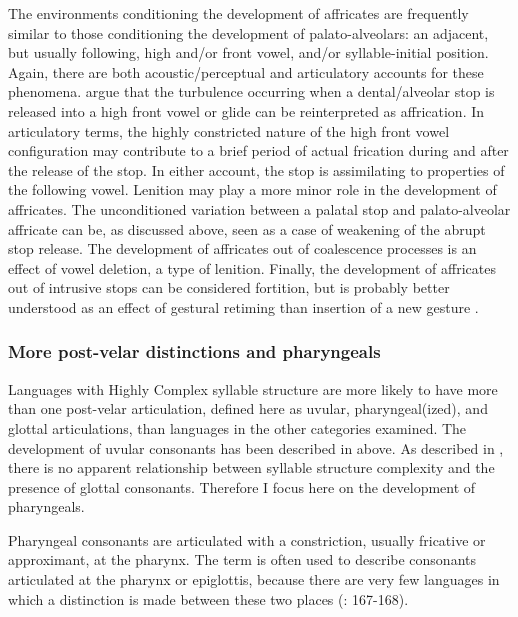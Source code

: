   The environments conditioning the development of affricates are frequently similar to those conditioning the development of palato-alveolars: an adjacent, but usually following, high and/or front vowel, and/or syllable-initial position. Again, there are both acoustic/perceptual and articulatory accounts for these phenomena. \citet{HallEtAl2006} argue that the turbulence occurring when a dental/alveolar stop is released into a high front vowel or glide can be reinterpreted as affrication. In articulatory terms, the highly constricted nature of the high front vowel configuration may contribute to a brief period of actual frication during and after the release of the stop. In either account, the stop is assimilating to properties of the following vowel. Lenition may play a more minor role in the development of affricates. The unconditioned variation between a palatal stop and palato-alveolar affricate can be, as discussed above, seen as a case of weakening of the abrupt stop release. The development of affricates out of coalescence processes is an effect of vowel deletion, a type of lenition. Finally, the development of affricates out of intrusive stops can be considered fortition, but is probably better understood as an effect of gestural retiming than insertion of a new gesture \citep[43-44]{Bybee2015b}.

\subsubsection{{More} {post-velar} {distinctions} {and} {pharyngeals}}\label{sec:4.5.2.5}

  Languages with Highly Complex syllable structure are more likely to have more than one post-velar articulation, defined here as uvular, pharyngeal(ized), and glottal articulations, than languages in the other categories examined. The development of uvular consonants has been described in  above. As described in , there is no apparent relationship between syllable structure complexity and the presence of glottal consonants. Therefore I focus here on the development of pharyngeals.

  Pharyngeal consonants are articulated with a constriction, usually fricative or approximant, at the pharynx. The term is often used to describe consonants articulated at the pharynx or epiglottis, because there are very few languages in which a distinction is made between these two places (\citealt{LadefogedMaddieson1996}: 167-168).


